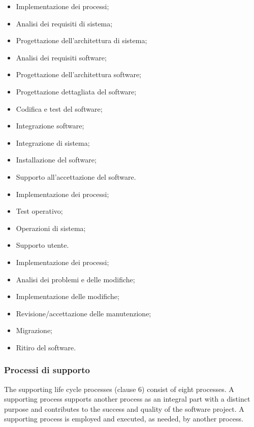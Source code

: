 \begin{itemize}
    \item Implementazione dei processi;
    \item Analisi dei requisiti di sistema;
    \item Progettazione dell'architettura di sistema;
    \item Analisi dei requisiti software;
    \item Progettazione dell'architettura software;   
    \item Progettazione dettagliata del software;
    \item Codifica e test del software;
    \item Integrazione software;
    \item Integrazione di sistema;
    \item Installazione del software;
    \item Supporto all'accettazione del software.
\end{itemize}

\begin{itemize}
    \item Implementazione dei processi;
    \item Test operativo;
    \item Operazioni di sistema;
    \item Supporto utente.
\end{itemize}

\begin{itemize}
    \item Implementazione dei processi;
    \item Analisi dei problemi e delle modifiche;
    \item Implementazione delle modifiche;
    \item Revisione/accettazione delle manutenzione;
    \item Migrazione;
    \item Ritiro del software.
\end{itemize}

\subsubsection{Processi di supporto}
The supporting life cycle processes (clause 6) consist of eight processes. A supporting process
supports another process as an integral part with a distinct purpose and contributes to the success and
quality of the software project. A supporting process is employed and executed, as needed, by another
process. 

